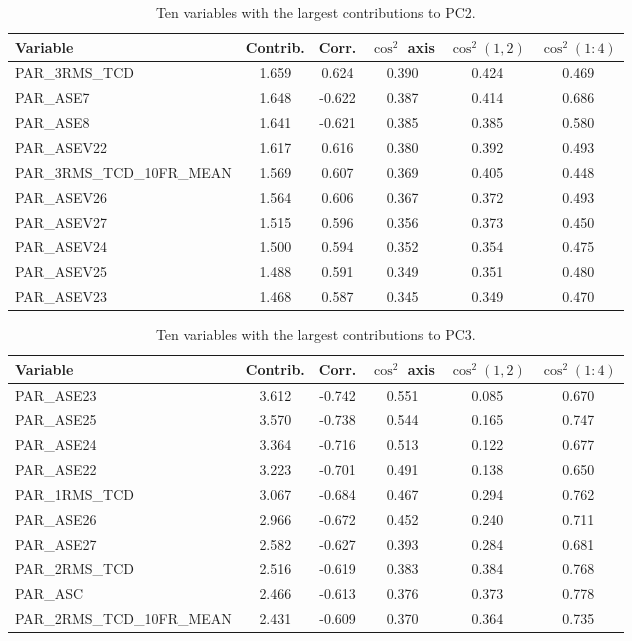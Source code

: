 \begin{table}[H]
\centering
\caption{Ten variables with the largest contributions to PC2.}
\label{tab:pca_pc2_variables}
\scriptsize

\begin{tabular}{lccccc}
\toprule
Variable & Contrib. & Corr. & \(\cos^2\) axis & \(\cos^2(1,2)\) & \(\cos^2(1{:}4)\) \\
\midrule
PAR\_3RMS\_TCD & 1.659 &  0.624 & 0.390 & 0.424 & 0.469 \\
PAR\_ASE7 & 1.648 & -0.622 & 0.387 & 0.414 & 0.686 \\
PAR\_ASE8 & 1.641 & -0.621 & 0.385 & 0.385 & 0.580 \\
PAR\_ASEV22 & 1.617 &  0.616 & 0.380 & 0.392 & 0.493 \\
PAR\_3RMS\_TCD\_10FR\_MEAN & 1.569 &  0.607 & 0.369 & 0.405 & 0.448 \\
PAR\_ASEV26 & 1.564 &  0.606 & 0.367 & 0.372 & 0.493 \\
PAR\_ASEV27 & 1.515 &  0.596 & 0.356 & 0.373 & 0.450 \\
PAR\_ASEV24 & 1.500 &  0.594 & 0.352 & 0.354 & 0.475 \\
PAR\_ASEV25 & 1.488 &  0.591 & 0.349 & 0.351 & 0.480 \\
PAR\_ASEV23 & 1.468 &  0.587 & 0.345 & 0.349 & 0.470 \\
\bottomrule
\end{tabular}
\end{table}

\begin{table}[H]
\centering
\caption{Ten variables with the largest contributions to PC3.}
\label{tab:pca_pc3_variables}
\scriptsize

\begin{tabular}{lccccc}
\toprule
Variable & Contrib. & Corr. & \(\cos^2\) axis & \(\cos^2(1,2)\) & \(\cos^2(1{:}4)\) \\
\midrule
PAR\_ASE23 & 3.612 & -0.742 & 0.551 & 0.085 & 0.670 \\
PAR\_ASE25 & 3.570 & -0.738 & 0.544 & 0.165 & 0.747 \\
PAR\_ASE24 & 3.364 & -0.716 & 0.513 & 0.122 & 0.677 \\
PAR\_ASE22 & 3.223 & -0.701 & 0.491 & 0.138 & 0.650 \\
PAR\_1RMS\_TCD & 3.067 & -0.684 & 0.467 & 0.294 & 0.762 \\
PAR\_ASE26 & 2.966 & -0.672 & 0.452 & 0.240 & 0.711 \\
PAR\_ASE27 & 2.582 & -0.627 & 0.393 & 0.284 & 0.681 \\
PAR\_2RMS\_TCD & 2.516 & -0.619 & 0.383 & 0.384 & 0.768 \\
PAR\_ASC & 2.466 & -0.613 & 0.376 & 0.373 & 0.778 \\
PAR\_2RMS\_TCD\_10FR\_MEAN & 2.431 & -0.609 & 0.370 & 0.364 & 0.735 \\
\bottomrule
\end{tabular}
\end{table}

